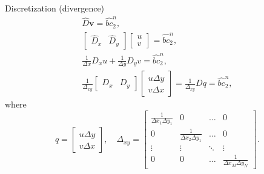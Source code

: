 \documentclass{beamer}
\begin{document}
	
	\begin{frame}{Discretization (divergence)}
	\begin{equation*}
	\begin{gathered}
	\hat{D}\boldsymbol{v}=\hat{bc}_2^n,\\
	\left[ 
	\begin{array}{ll}
	\hat{D}_x & \hat{D}_y 	
	\end{array}
	\right]\left[\begin{array}{l}
	u\\
	v
	\end{array}
	\right]=\hat{bc}_2^n
	, \\
	\frac{1}{\Delta x} D_x u+\frac{1}{\Delta y} D_y v=\hat{bc}_2^n, \\
	\frac{1}{\Delta _{xy}}\left[\begin{array}{ll}
	D_x & D_y
	\end{array}\right]\left[\begin{array}{l}
	u \Delta y \\
	v \Delta x
	\end{array}\right]=\frac{1}{\Delta _{xy}} D q=\hat{bc}_2^n,
	\end{gathered}
	\end{equation*}	
	where 
	\begin{equation}\label{eqn:delta-xy}
		q=\left[\begin{array}{l}
	u \Delta y \\
	v \Delta x
	\end{array}\right], \quad \Delta _{xy}=
		\begin{bmatrix}{}
			\frac{1}{\Delta x_1\Delta y_1}		&0	&\dots	&0\\
			0		&\frac{1}{\Delta x_2\Delta y_1}	&\dots	&0\\
			\vdots		&\vdots	&\ddots	&\vdots\\
			0		&0	&\dots	&\frac{1}{\Delta x_M\Delta y_N}
		\end{bmatrix}.
	\end{equation}
	
	\end{frame}
	
\end{document}
